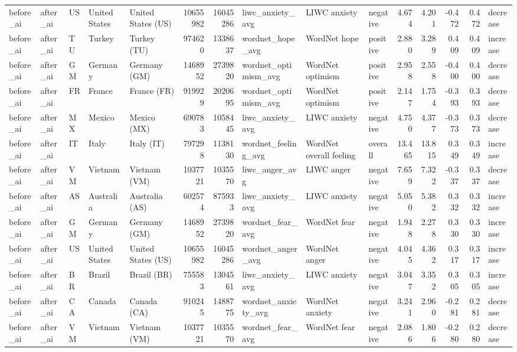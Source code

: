 \begin{tabular}{lllllrrlllrrrrl}
before\_ai & after\_ai & US & United States & United States (US) & 10655982 & 16045286 & liwc\_anxiety\_avg & LIWC anxiety & negative & 4.674 & 4.201 & -0.472 & 0.472 & decrease \\
before\_ai & after\_ai & TU & Turkey & Turkey (TU) & 974620 & 1338637 & wordnet\_hope\_avg & WordNet hope & positive & 2.880 & 3.289 & 0.409 & 0.409 & increase \\
before\_ai & after\_ai & GM & Germany & Germany (GM) & 1468952 & 2739820 & wordnet\_optimism\_avg & WordNet optimism & positive & 2.958 & 2.558 & -0.400 & 0.400 & decrease \\
before\_ai & after\_ai & FR & France & France (FR) & 919929 & 2020695 & wordnet\_optimism\_avg & WordNet optimism & positive & 2.147 & 1.754 & -0.393 & 0.393 & decrease \\
before\_ai & after\_ai & MX & Mexico & Mexico (MX) & 690783 & 1058445 & liwc\_anxiety\_avg & LIWC anxiety & negative & 4.750 & 4.377 & -0.373 & 0.373 & decrease \\
before\_ai & after\_ai & IT & Italy & Italy (IT) & 797298 & 1138130 & wordnet\_feeling\_avg & WordNet overall feeling & overall & 13.465 & 13.815 & 0.349 & 0.349 & increase \\
before\_ai & after\_ai & VM & Vietnam & Vietnam (VM) & 1037721 & 1035570 & liwc\_anger\_avg & LIWC anger & negative & 7.659 & 7.322 & -0.337 & 0.337 & decrease \\
before\_ai & after\_ai & AS & Australia & Australia (AS) & 602574 & 875933 & liwc\_anxiety\_avg & LIWC anxiety & negative & 5.050 & 5.382 & 0.332 & 0.332 & increase \\
before\_ai & after\_ai & GM & Germany & Germany (GM) & 1468952 & 2739820 & wordnet\_fear\_avg & WordNet fear & negative & 1.948 & 2.278 & 0.330 & 0.330 & increase \\
before\_ai & after\_ai & US & United States & United States (US) & 10655982 & 16045286 & wordnet\_anger\_avg & WordNet anger & negative & 4.045 & 4.362 & 0.317 & 0.317 & increase \\
before\_ai & after\_ai & BR & Brazil & Brazil (BR) & 755583 & 1304561 & liwc\_anxiety\_avg & LIWC anxiety & negative & 3.047 & 3.352 & 0.305 & 0.305 & increase \\
before\_ai & after\_ai & CA & Canada & Canada (CA) & 910245 & 1488775 & wordnet\_anxiety\_avg & WordNet anxiety & negative & 3.241 & 2.960 & -0.281 & 0.281 & decrease \\
before\_ai & after\_ai & VM & Vietnam & Vietnam (VM) & 1037721 & 1035570 & wordnet\_fear\_avg & WordNet fear & negative & 2.086 & 1.806 & -0.280 & 0.280 & decrease \\

\end{tabular}
